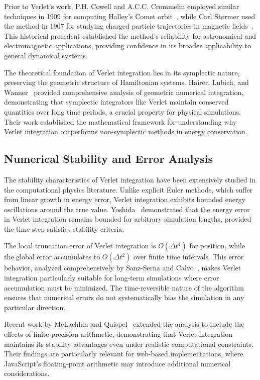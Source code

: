 \documentclass[12pt,journal,onecolumn]{IEEEtran}
\begin{document}
Prior to Verlet's work, P.H. Cowell and A.C.C. Crommelin employed similar techniques in 1909 for computing Halley's Comet orbit~\cite{cowell1909}, while Carl Størmer used the method in 1907 for studying charged particle trajectories in magnetic fields~\cite{stormer1907}. This historical precedent established the method's reliability for astronomical and electromagnetic applications, providing confidence in its broader applicability to general dynamical systems.

The theoretical foundation of Verlet integration lies in its symplectic nature, preserving the geometric structure of Hamiltonian systems. Hairer, Lubich, and Wanner~\cite{hairer2003} provided comprehensive analysis of geometric numerical integration, demonstrating that symplectic integrators like Verlet maintain conserved quantities over long time periods, a crucial property for physical simulations. Their work established the mathematical framework for understanding why Verlet integration outperforms non-symplectic methods in energy conservation.

\subsection{Numerical Stability and Error Analysis}
The stability characteristics of Verlet integration have been extensively studied in the computational physics literature. Unlike explicit Euler methods, which suffer from linear growth in energy error, Verlet integration exhibits bounded energy oscillations around the true value. Yoshida~\cite{yoshida1990} demonstrated that the energy error in Verlet integration remains bounded for arbitrary simulation lengths, provided the time step satisfies stability criteria.

The local truncation error of Verlet integration is $O(\Delta t^4)$ for position, while the global error accumulates to $O(\Delta t^2)$ over finite time intervals. This error behavior, analyzed comprehensively by Sanz-Serna and Calvo~\cite{sanz1994}, makes Verlet integration particularly suitable for long-term simulations where error accumulation must be minimized. The time-reversible nature of the algorithm ensures that numerical errors do not systematically bias the simulation in any particular direction.

Recent work by McLachlan and Quispel~\cite{mclachlan2002} extended the analysis to include the effects of finite precision arithmetic, demonstrating that Verlet integration maintains its stability advantages even under realistic computational constraints. Their findings are particularly relevant for web-based implementations, where JavaScript's floating-point arithmetic may introduce additional numerical considerations.
\end{document}
